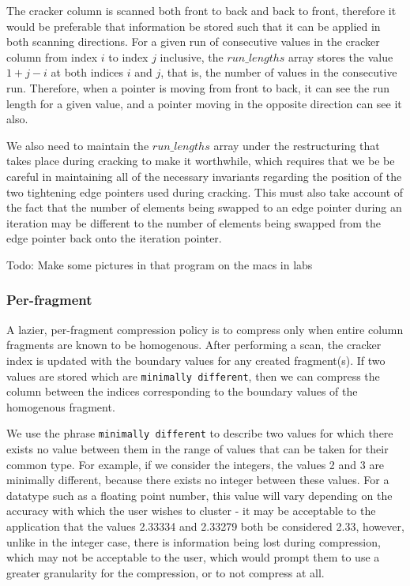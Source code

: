 The cracker column is scanned both front to back and back to front, therefore it would be preferable
that information be stored such that it can be applied in both scanning directions. For a given run of
consecutive values in the cracker column from index $i$ to index $j$ inclusive, the $run\_lengths$
array stores the value $1 + j - i$ at both indices $i$ and $j$, that is, the number of values in the
consecutive run. Therefore, when a pointer is moving from front to back, it can see the run length for
a given value, and a pointer moving in the opposite direction can see it also.

We also need to maintain the $run\_lengths$ array under the restructuring that takes place during
cracking to make it worthwhile, which requires that we be be careful in maintaining all of the
necessary invariants regarding the position of the two tightening edge pointers used during cracking.
This must also take account of the fact that the number of elements being swapped to an edge
pointer during an iteration may be different to the number of elements being swapped from the edge
pointer back onto the iteration pointer.

Todo: Make some pictures in that program on the macs in labs

\subsubsection{Per-fragment}

A lazier, per-fragment compression policy is to compress only when entire column fragments are
known to be homogenous. After performing a scan, the cracker index is updated with the boundary
values for any created fragment(s). If two values are stored which are \texttt{minimally different},
then we can compress the column between the indices corresponding to the boundary values of the
homogenous fragment.

We use the phrase \texttt{minimally different} to describe two values for which there exists no value
between them in the range of values that can be taken for their common type. For example, if we
consider the integers, the values 2 and 3 are minimally different, because there exists no integer
between these values. For a datatype such as a floating point number, this value will vary depending
on the accuracy with which the user wishes to cluster - it may be acceptable to the application that
the values 2.33334 and 2.33279 both be considered 2.33, however, unlike in the integer case, there is
information being lost during compression, which may not be acceptable to the user, which would prompt
them to use a greater granularity for the compression, or to not compress at all.

